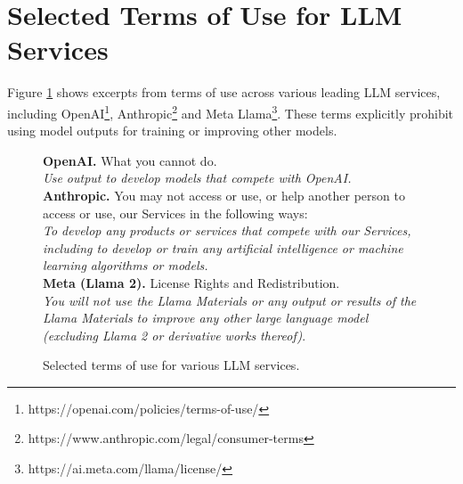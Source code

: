 \section{Selected Terms of Use for LLM Services}
\label{sec:terms_of_use}
Figure \ref{fig:terms} shows excerpts from terms of use across various leading LLM services, including OpenAI\footnote{https://openai.com/policies/terms-of-use/}, Anthropic\footnote{https://www.anthropic.com/legal/consumer-terms} and Meta Llama\footnote{https://ai.meta.com/llama/license/}. These terms explicitly prohibit using model outputs for training or improving other models.
\begin{figure}[h!]
\begin{tcolorbox}[colback=gray!10, colframe=black, rounded corners]
\textbf{OpenAI.} What you cannot do.\\[0.5em]
\textit{Use output to develop models that compete with OpenAI.} \\[0.5em]
\textbf{Anthropic.} You may not access or use, or help another person to access or use, our Services in the following ways: \\[0.5em] \textit{To develop any products or services that compete with our Services, including to develop or train any artificial intelligence or machine learning algorithms or models.} \\[0.5em]
\textbf{Meta (Llama 2).} License Rights and Redistribution.\\[0.5em]
\textit{You will not use the Llama Materials or any output or results of the Llama Materials to improve any other large language model (excluding Llama 2 or derivative works thereof)}.
\end{tcolorbox}
\caption{Selected terms of use for various LLM services.}
\label{fig:terms}
\end{figure}